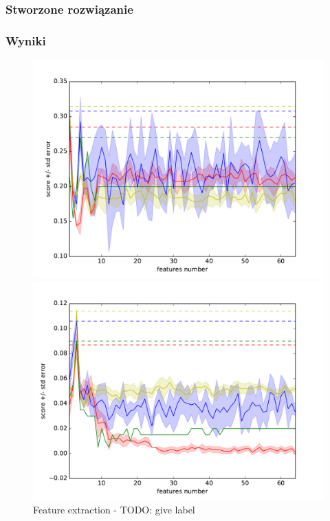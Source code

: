 \subsubsection{Stworzone rozwiązanie}
\subsubsection{Wyniki}

\newcommand{\fesize}{0.45}

\begin{figure}
\centering
\begin{minipage}{.5\textwidth}

\centering
\includegraphics[scale=\fesize]{res/digits_300_all_LinearDiscriminantAnalysis.pdf}

  
\end{minipage}%
\begin{minipage}{.5\textwidth}

\centering
\includegraphics[scale=\fesize]{res/digits_300_all_PCA.pdf}
  
\end{minipage}
\caption[Caption for LOF]{Feature extraction - TODO: give label\label{higgsall}}
\end{figure}

